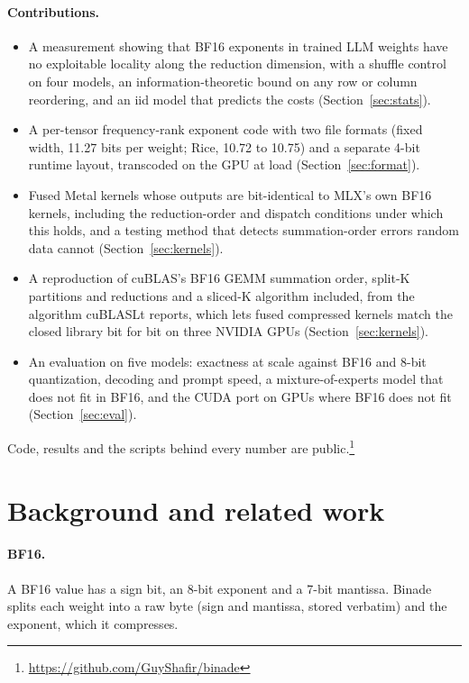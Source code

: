 \documentclass[11pt]{article}
\begin{document}
\paragraph{Contributions.}
\begin{itemize}
\item A measurement showing that BF16 exponents in trained LLM weights have no exploitable locality along the reduction dimension, with a shuffle control on four models, an information-theoretic bound on any row or column reordering, and an iid model that predicts the costs (Section~\ref{sec:stats}).
\item A per-tensor frequency-rank exponent code with two file formats (fixed width, 11.27 bits per weight; Rice, 10.72 to 10.75) and a separate 4-bit runtime layout, transcoded on the GPU at load (Section~\ref{sec:format}).
\item Fused Metal kernels whose outputs are bit-identical to MLX's own BF16 kernels, including the reduction-order and dispatch conditions under which this holds, and a testing method that detects summation-order errors random data cannot (Section~\ref{sec:kernels}).
\item A reproduction of cuBLAS's BF16 GEMM summation order, split-K partitions and reductions and a sliced-K algorithm included, from the algorithm cuBLASLt reports, which lets fused compressed kernels match the closed library bit for bit on three NVIDIA GPUs (Section~\ref{sec:kernels}).
\item An evaluation on five models: exactness at scale against BF16 and 8-bit quantization, decoding and prompt speed, a mixture-of-experts model that does not fit in BF16, and the CUDA port on GPUs where BF16 does not fit (Section~\ref{sec:eval}).
\end{itemize}
Code, results and the scripts behind every number are public.\footnote{\url{https://github.com/GuyShafir/binade}}

\section{Background and related work}
\label{sec:related}

\paragraph{BF16.} A BF16 value has a sign bit, an 8-bit exponent and a 7-bit mantissa. Binade splits each weight into a raw byte (sign and mantissa, stored verbatim) and the exponent, which it compresses.
\end{document}
